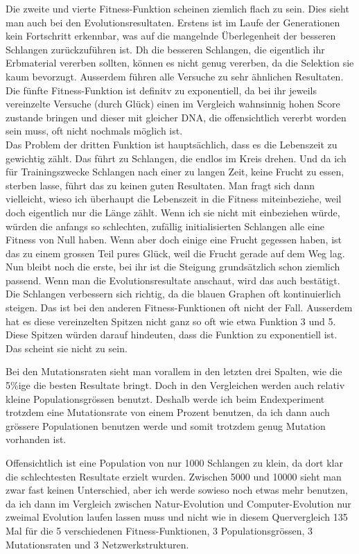 \documentclass[10pt,a4paper,ngerman,english]{article}
\begin{document}
Die zweite und vierte Fitness-Funktion scheinen ziemlich flach zu sein. Dies sieht man auch bei den Evolutionsresultaten. Erstens ist im Laufe der Generationen kein Fortschritt erkennbar, was auf die mangelnde Überlegenheit der besseren Schlangen zurückzuführen ist. Dh die besseren Schlangen, die eigentlich ihr Erbmaterial vererben sollten, können es nicht genug vererben, da die Selektion sie kaum bevorzugt. Ausserdem führen alle Versuche zu sehr ähnlichen Resultaten.\\
Die fünfte Fitness-Funktion ist definitv zu exponentiell, da bei ihr jeweils vereinzelte Versuche (durch Glück) einen im Vergleich wahnsinnig hohen Score zustande bringen und dieser mit gleicher DNA, die offensichtlich vererbt worden sein muss, oft nicht nochmals möglich ist.\\
Das Problem der dritten Funktion ist hauptsächlich, dass es die Lebenszeit zu gewichtig zählt. Das führt zu Schlangen, die endlos im Kreis drehen. Und da ich für Trainingszwecke Schlangen nach einer zu langen Zeit, keine Frucht zu essen, sterben lasse, führt das zu keinen guten Resultaten. Man fragt sich dann vielleicht, wieso ich überhaupt die Lebenszeit in die Fitness miteinbeziehe, weil doch eigentlich nur die Länge zählt. Wenn ich sie nicht mit einbeziehen würde, würden die anfangs so schlechten, zufällig initialisierten Schlangen alle eine Fitness von Null haben. Wenn aber doch einige eine Frucht gegessen haben, ist das zu einem grossen Teil pures Glück, weil die Frucht gerade auf dem Weg lag.\\
Nun bleibt noch die erste, bei ihr ist die Steigung grundsätzlich schon ziemlich passend. Wenn man die Evolutionsresultate anschaut, wird das auch bestätigt. Die Schlangen verbessern sich richtig, da die blauen Graphen oft kontinuierlich steigen. Das ist bei den anderen Fitness-Funktionen oft nicht der Fall. Ausserdem hat es diese vereinzelten Spitzen nicht ganz so oft wie etwa Funktion 3 und 5. Diese Spitzen würden darauf hindeuten, dass die Funktion zu exponentiell ist. Das scheint sie nicht zu sein.

\bigskip
Bei den Mutationsraten sieht man vorallem in den letzten drei Spalten, wie die 5\%ige die besten Resultate bringt. Doch in den Vergleichen werden auch relativ kleine Populationsgrössen benutzt. Deshalb werde ich beim Endexperiment trotzdem eine Mutationsrate von einem Prozent benutzen, da ich dann auch grössere Populationen benutzen werde und somit trotzdem genug Mutation vorhanden ist.

\bigskip
Offensichtlich ist eine Population von nur 1000 Schlangen zu klein, da dort klar die schlechtesten Resultate erzielt wurden. Zwischen 5000 und 10000 sieht man zwar fast keinen Unterschied, aber ich werde sowieso noch etwas mehr benutzen, da ich dann im Vergleich zwischen Natur-Evolution und Computer-Evolution nur zweimal Evolution laufen lassen muss und nicht wie in diesem Quervergleich 135 Mal für die 5 verschiedenen Fitness-Funktionen, 3 Populationsgrössen, 3 Mutationsraten und 3 Netzwerkstrukturen.
\end{document}
